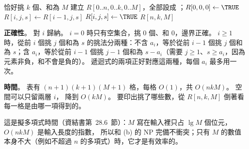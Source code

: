 \begin{pastsoln}
\begin{pseudo}{恰好挑 $k$ 個、和為 $M$}
        \State \Return \FALSE
    \EndIf
    \State 建立 $R[0..n, 0..k, 0..M]$，全部設成 \FALSE；$R[0, 0, 0] \gets \TRUE$
                \State $R[i, j, s] \gets R[i-1, j, s]$ 
                    \State $R[i, j, s] \gets \TRUE$ 
                \EndIf
            \EndFor
        \EndFor
    \EndFor
    \State \Return $R[n, k, M]$
\EndFunction
\end{pseudo}

\textbf{正確性}。 對 $i$ 歸納。 $i = 0$ 時只有空集合，挑 $0$ 個、和 $0$，邊界正確。 $i \ge 1$ 時，從前 $i$
個挑 $j$ 個和為 $s$ 的挑法分兩種：不含 $a_i$，等於從前 $i - 1$ 個挑 $j$ 個和為 $s$；含 $a_i$，等於從前
$i - 1$ 個挑 $j - 1$ 個和為 $s - a_i$（需要 $j \ge 1$、$s \ge a_i$，因為元素非負，和不會是負的）。
遞迴式的兩項正好對應這兩種，每個 $a_i$ 最多用一次。

\textbf{時間}。 表有 $(n + 1)(k + 1)(M + 1)$ 格，每格 $O(1)$，共 $O(nkM)$。 空間可以只留兩層 $i$，
降到 $O(kM)$。 要印出挑了哪些數，從 $R[n, k, M]$ 倒著看每一格是由哪一項得到的。

這是擬多項式時間（資結書第~28.6~節）：$M$ 寫在輸入裡只占 $\lg M$ 個位元，$O(nkM)$ 是輸入長度的指數，
所以和 (b) 的 NP 完備不衝突；只有 $M$ 的數值本身不大（例如不超過 $n$ 的多項式）時，它才是有效率的。
\end{pastsoln}
